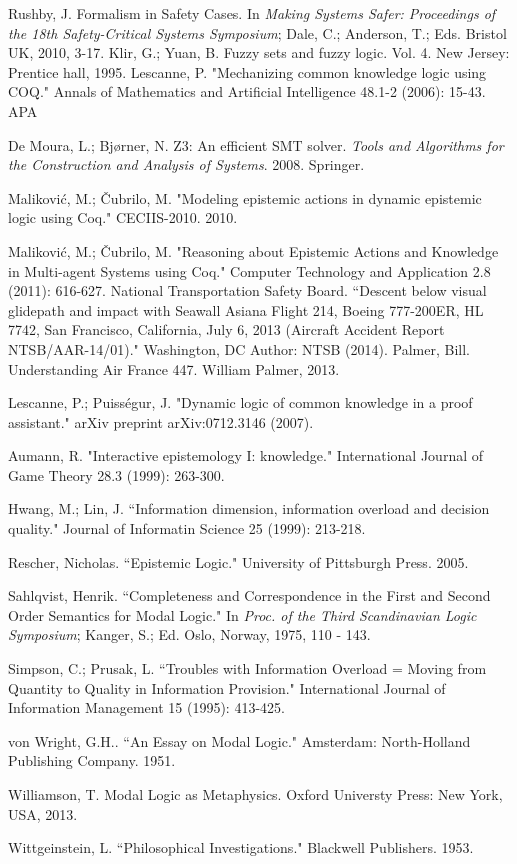 \begin{thebibliography}{9}
	 	Rushby, J. Formalism in Safety Cases. In {\em Making Systems Safer: Proceedings of the 18th Safety-Critical Systems Symposium}; Dale, C.; Anderson, T.; Eds. Bristol UK, 2010, 3-17.
	 	Klir, G.; Yuan, B. Fuzzy sets and fuzzy logic. Vol. 4. New Jersey: Prentice hall, 1995.
	 	Lescanne, P. "Mechanizing common knowledge logic using COQ." Annals of Mathematics and Artificial Intelligence 48.1-2 (2006): 15-43.
	 	APA	
	 	
 		 De Moura, L.; Bj{\o}rner, N. Z3: An efficient SMT solver. \emph{Tools and Algorithms for the Construction and Analysis of Systems}. 2008. Springer.
	 	
	 	Malikovi\'c, M.; \v Cubrilo, M. "Modeling epistemic actions in dynamic epistemic logic using Coq." CECIIS-2010. 2010.
	 	
	 	Malikovi\'c, M.; \v Cubrilo, M. "Reasoning about Epistemic Actions and Knowledge in Multi-agent Systems using Coq." Computer Technology and Application 2.8 (2011): 616-627.
	 	National Transportation Safety Board. ``Descent below visual glidepath and impact with Seawall Asiana Flight 214, Boeing 777-200ER, HL 7742, San Francisco, California, July 6, 2013 (Aircraft Accident Report NTSB/AAR-14/01)." Washington, DC Author: NTSB (2014).
	 	Palmer, Bill. Understanding Air France 447. William Palmer, 2013.
	 	
	 	Lescanne, P.; Puiss\'egur, J. "Dynamic logic of common knowledge in a proof assistant." arXiv preprint arXiv:0712.3146 (2007).
	 	
	 	Aumann, R. "Interactive epistemology I: knowledge." International Journal of Game Theory 28.3 (1999): 263-300.
	 	
	 	Hwang, M.; Lin, J. ``Information dimension, information overload and decision quality." Journal of Informatin Science 25 (1999): 213-218.
	 	
	 	Rescher, Nicholas. ``Epistemic Logic." University of Pittsburgh Press. 2005.
	 	
	 	Sahlqvist, Henrik. ``Completeness and Correspondence in the First and Second Order Semantics for Modal Logic." In {\em Proc. of the Third Scandinavian Logic Symposium}; Kanger, S.; Ed. Oslo, Norway, 1975, 110 - 143.
	 	
	 	Simpson, C.; Prusak, L. ``Troubles with Information Overload = Moving from Quantity to Quality in Information Provision." International Journal of Information Management 15 (1995): 413-425.
	 	
	 	von Wright, G.H.. ``An Essay on Modal Logic." Amsterdam: North-Holland Publishing Company. 1951.
	 	
	 	Williamson, T. Modal Logic as Metaphysics. Oxford Universty Press: New York, USA, 2013.
	 	
	 	Wittgeinstein, L. ``Philosophical Investigations." Blackwell Publishers. 1953.
\end{thebibliography}
